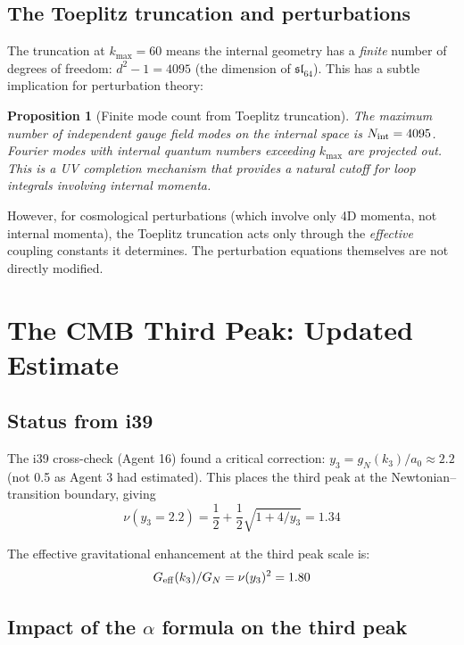 \documentclass[11pt,a4paper]{article}
\newtheorem{proposition}{Proposition}
\newcommand{\slp}{\mathfrak{sl}}
\begin{document}
\subsection{The Toeplitz truncation and perturbations}

The truncation at $k_{\max} = 60$ means the internal geometry has a \emph{finite} number of degrees of freedom: $d^2 - 1 = 4095$ (the dimension of $\slp_{64}$). This has a subtle implication for perturbation theory:

\begin{proposition}[Finite mode count from Toeplitz truncation]
\label{prop:mode-count}
The maximum number of independent gauge field modes on the internal space is $N_{\rm int} = 4095$. Fourier modes with internal quantum numbers exceeding $k_{\max}$ are projected out. This is a UV completion mechanism that provides a natural cutoff for loop integrals involving internal momenta.
\end{proposition}

However, for cosmological perturbations (which involve only 4D momenta, not internal momenta), the Toeplitz truncation acts only through the \emph{effective} coupling constants it determines. The perturbation equations themselves are not directly modified.

\section{The CMB Third Peak: Updated Estimate}

\subsection{Status from i39}

The i39 cross-check (Agent 16) found a critical correction: $y_3 = g_N(k_3)/a_0 \approx 2.2$ (not 0.5 as Agent 3 had estimated). This places the third peak at the Newtonian--transition boundary, giving
\begin{equation}
\nu(y_3 = 2.2) = \frac{1}{2} + \frac{1}{2}\sqrt{1 + 4/y_3} = 1.34
\end{equation}

The effective gravitational enhancement at the third peak scale is:
\begin{equation}
G_{\rm eff}(k_3)/G_N = \nu(y_3)^2 = 1.80
\end{equation}

\subsection{Impact of the $\alpha$ formula on the third peak}
\end{document}
